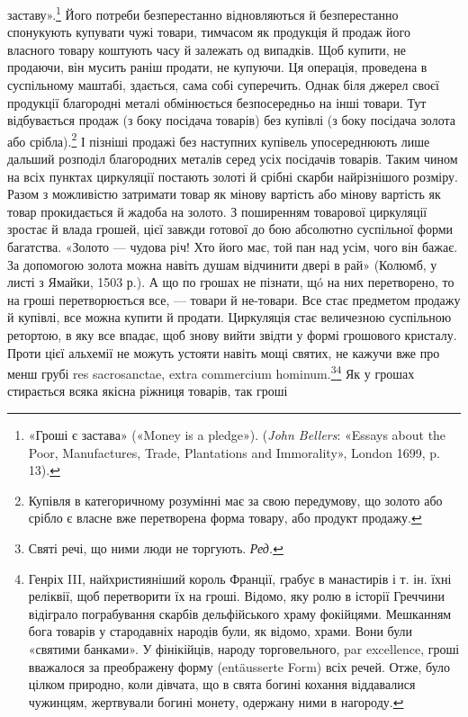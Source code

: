 \parcont{}  %
заставу».\footnote{
«Гроші є застава» («Money is a pledge»). (\emph{John Bellers}: «Essays
about the Poor, Manufactures, Trade, Plantations and Immorality», London
1699, p. 13).
} Його потреби безперестанно відновляються й безперестанно
спонукують купувати чужі товари, тимчасом як продукція
й продаж його власного товару коштують часу й залежать
од випадків. Щоб купити, не продаючи, він мусить раніш продати,
не купуючи. Ця операція, проведена в суспільному маштабі,
здається, сама собі суперечить. Однак біля джерел своєї продукції
благородні металі обмінюється безпосередньо на інші товари.
Тут відбувається продаж (з боку посідача товарів) без купівлі
(з боку посідача золота або срібла).\footnote{
Купівля в категоричному розумінні має за свою передумову, що
золото або срібло є власне вже перетворена форма товару, або продукт
продажу.
} І пізніші продажі без наступних
купівель упосереднюють лише дальший розподіл благородних
металів серед усіх посідачів товарів. Таким чином на
всіх пунктах циркуляції постають золоті й срібні скарби найрізнішого
розміру. Разом з можливістю затримати товар як
мінову вартість або мінову вартість як товар прокидається й
жадоба на золото. З поширенням товарової циркуляції зростає й
влада грошей, цієї завжди готової до бою абсолютно суспільної
форми багатства. «Золото — чудова річ! Хто його має, той пан
над усім, чого він бажає. За допомогою золота можна навіть
душам відчинити двері в рай» (Колюмб, у листі з Ямайки, 1503 р.).
А що по грошах не пізнати, щó на них перетворено, то на гроші
перетворюється все, — товари й не-товари. Все стає предметом
продажу й купівлі, все можна купити й продати. Циркуляція
стає величезною суспільною ретортою, в яку все впадає, щоб
знову вийти звідти у формі грошового кристалу. Проти цієї
альхемії не можуть устояти навіть мощі святих, не кажучи вже
про менш грубі res sacrosanctae, extra commercium hominum.\footnote*{
Святі речі, що ними люди не торгують. \emph{Ред.}
}\footnote{
Генріх III, найхристияніший король Франції, грабує в манастирів
і т. ін. їхні реліквії, щоб перетворити їх на гроші. Відомо, яку ролю
в історії Греччини відіграло пограбування скарбів дельфійського храму
фокійцями. Мешканням бога товарів у стародавніх народів були, як відомо,
храми. Вони були «святими банками». У фінікійців, народу торговельного,
par excellence, гроші вважалося за преображену форму (entäusserte
Form) всіх речей. Отже, було цілком природно, коли дівчата, що в
свята богині кохання віддавалися чужинцям, жертвували богині монету,
одержану ними в нагороду.
} Як у грошах стирається всяка якісна ріжниця товарів, так гроші
